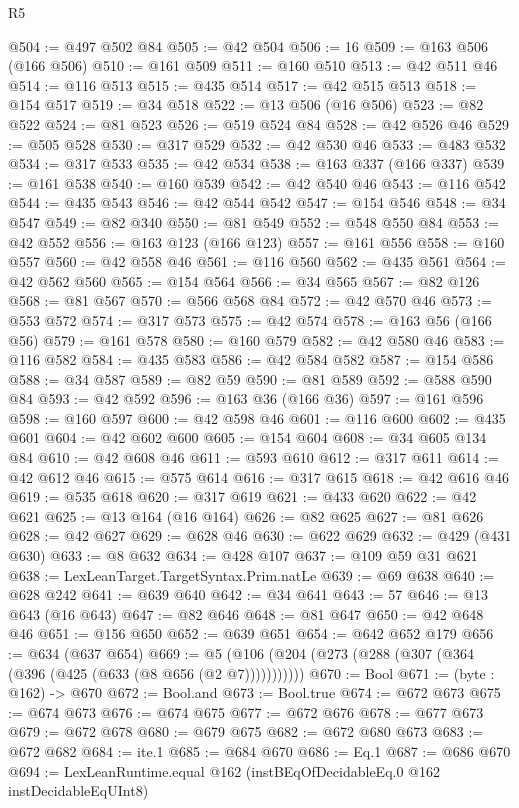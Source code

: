 \begin{lexlean}{R5}
\begin{coremodule}
{{{{{{{{{{{{{{{{{{{@504 := @497 @502 @84
@505 := @42 @504
@506 := 16
@509 := @163 @506 (@166 @506)
@510 := @161 @509
@511 := @160 @510
@513 := @42 @511 @46
@514 := @116 @513
@515 := @435 @514
@517 := @42 @515 @513
@518 := @154 @517
@519 := @34 @518
@522 := @13 @506 (@16 @506)
@523 := @82 @522
@524 := @81 @523
@526 := @519 @524 @84
@528 := @42 @526 @46
@529 := @505 @528
@530 := @317 @529
@532 := @42 @530 @46
@533 := @483 @532
@534 := @317 @533
@535 := @42 @534
@538 := @163 @337 (@166 @337)
@539 := @161 @538
@540 := @160 @539
@542 := @42 @540 @46
@543 := @116 @542
@544 := @435 @543
@546 := @42 @544 @542
@547 := @154 @546
@548 := @34 @547
@549 := @82 @340
@550 := @81 @549
@552 := @548 @550 @84
@553 := @42 @552
@556 := @163 @123 (@166 @123)
@557 := @161 @556
@558 := @160 @557
@560 := @42 @558 @46
@561 := @116 @560
@562 := @435 @561
@564 := @42 @562 @560
@565 := @154 @564
@566 := @34 @565
@567 := @82 @126
@568 := @81 @567
@570 := @566 @568 @84
@572 := @42 @570 @46
@573 := @553 @572
@574 := @317 @573
@575 := @42 @574
@578 := @163 @56 (@166 @56)
@579 := @161 @578
@580 := @160 @579
@582 := @42 @580 @46
@583 := @116 @582
@584 := @435 @583
@586 := @42 @584 @582
@587 := @154 @586
@588 := @34 @587
@589 := @82 @59
@590 := @81 @589
@592 := @588 @590 @84
@593 := @42 @592
@596 := @163 @36 (@166 @36)
@597 := @161 @596
@598 := @160 @597
@600 := @42 @598 @46
@601 := @116 @600
@602 := @435 @601
@604 := @42 @602 @600
@605 := @154 @604
@608 := @34 @605 @134 @84
@610 := @42 @608 @46
@611 := @593 @610
@612 := @317 @611
@614 := @42 @612 @46
@615 := @575 @614
@616 := @317 @615
@618 := @42 @616 @46
@619 := @535 @618
@620 := @317 @619
@621 := @433 @620
@622 := @42 @621
@625 := @13 @164 (@16 @164)
@626 := @82 @625
@627 := @81 @626
@628 := @42 @627
@629 := @628 @46
@630 := @622 @629
@632 := @429 (@431 @630)
@633 := @8 @632
@634 := @428 @107
@637 := @109 @59 @31 @621
@638 := LexLeanTarget.TargetSyntax.Prim.natLe
@639 := @69 @638
@640 := @628 @242
@641 := @639 @640
@642 := @34 @641
@643 := 57
@646 := @13 @643 (@16 @643)
@647 := @82 @646
@648 := @81 @647
@650 := @42 @648 @46
@651 := @156 @650
@652 := @639 @651
@654 := @642 @652 @179
@656 := @634 (@637 @654)
@669 := @5 (@106 (@204 (@273 (@288 (@307 (@364 (@396 (@425 (@633 (@8 @656 (@2 @7)))))))))))
@670 := Bool
@671 := (byte : @162) -> @670
@672 := Bool.and
@673 := Bool.true
@674 := @672 @673
@675 := @674 @673
@676 := @674 @675
@677 := @672 @676
@678 := @677 @673
@679 := @672 @678
@680 := @679 @675
@682 := @672 @680 @673
@683 := @672 @682
@684 := ite.{1}
@685 := @684 @670
@686 := Eq.{1}
@687 := @686 @670
@694 := LexLeanRuntime.equal @162 (instBEqOfDecidableEq.{0} @162 instDecidableEqUInt8)
}}}}}}}}}}}}}}}}}}}
\end{coremodule}
\end{lexlean}
